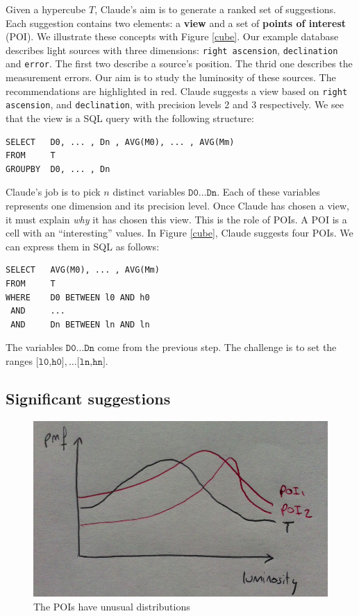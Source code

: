 Given a hypercube $T$, Claude's aim is to generate a ranked set of suggestions.
Each suggestion contains two elements: a \textbf{view} and a set of
\textbf{points of interest} (POI). We illustrate these concepts with Figure
\ref{cube}. Our example database describes light sources with three
dimensions: \texttt{right ascension}, \texttt{declination} and \texttt{error}.
The first two describe a source's position. The thrid one describes the
measurement errors. Our aim is to study the luminosity of these sources. The
recommendations are highlighted in red. Claude suggests a view based on
\texttt{right ascension}, and \texttt{declination}, with precision levels 2 and
3 respectively. We see that the view is a SQL query with the following
structure:
\begin{verbatim}
SELECT   D0, ... , Dn , AVG(M0), ... , AVG(Mm)
FROM     T
GROUPBY  D0, ... , Dn
\end{verbatim}
Claude's job is to pick $n$ distinct variables $\texttt{D0} \ldots
\texttt{Dn}$. Each of these variables represents one dimension and its
precision level.  Once Claude has chosen a view, it must explain \emph{why} it
has chosen this view.  This is the role of POIs. A POI is a 
cell with an ``interesting'' values. In Figure \ref{cube}, Claude suggests
four POIs. We can express them in SQL as follows:
\begin{verbatim}
SELECT   AVG(M0), ... , AVG(Mm)
FROM     T
WHERE    D0 BETWEEN l0 AND h0
 AND     ...
 AND     Dn BETWEEN ln AND ln
\end{verbatim}
The variables $\texttt{D0} \ldots \texttt{Dn}$ come from the previous step. The
challenge is to set the ranges $\texttt{[l0,h0]}, \dots \texttt{[ln,hn]}$.


\subsection{Significant suggestions}
\begin{figure}[t!]
\centering
\includegraphics[width=\columnwidth]{images/poi}
\caption{The POIs have unusual distributions}
\label{poi}
\end{figure}


